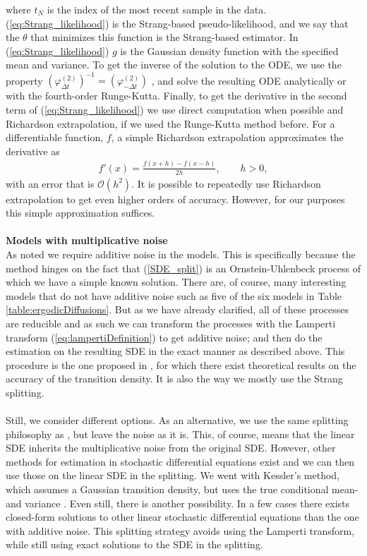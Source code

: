 where $t_N$ is the index of the most recent sample in the data. (\ref{eq:Strang_likelihood}) is the Strang-based pseudo-likelihood, and we say that the $\theta$ that minimizes this function is the Strang-based estimator. In (\ref{eq:Strang_likelihood}) $g$ is the Gaussian density function with the specified mean and variance. 
To get the inverse of the solution to the ODE, we use the property $\left(\varphi_{\Delta t}^{(2)}\right)^{-1} = \left(\varphi_{-\Delta t}^{(2)}\right)$ \cite[Remark below equation (9)]{SplittingSchemes}, and solve the resulting ODE analytically or with the fourth-order Runge-Kutta. Finally, to get the derivative in the second term of (\ref{eq:Strang_likelihood}) we use direct computation when possible and Richardson extrapolation, if we used the Runge-Kutta method before. For a differentiable function, $f$, a simple Richardson extrapolation approximates the derivative as
\begin{align}
    f'(x) = \frac{f(x + h) - f(x - h)}{2h}, \qquad h > 0,
\end{align}
with an error that is $\mathcal{O}(h^2)$. It is possible to repeatedly use Richardson extrapolation to get even higher orders of accuracy. However, for our purposes this simple approximation suffices.
\\\\
\textbf{Models with multiplicative noise}\\
As noted we require additive noise in the models. This is specifically because the method hinges on the fact that (\ref{SDE_split}) is an Ornstein-Uhlenbeck process of which we have a simple known solution. There are, of course, many interesting models that do not have additive noise such as five of the six models in Table \ref{table:ergodicDiffusions}. But as we have already clarified, all of these processes are reducible and as such we can transform the processes with the Lamperti transform (\ref{eq:lampertiDefinition}) to get additive noise; and then do the estimation on the resulting SDE in the exact manner as described above. This procedure is the one proposed in \cite{SplittingSchemes}, for which there exist theoretical results on the accuracy of the transition density. It is also the way we mostly use the Strang splitting.\\\\
Still, we consider different options. As an alternative, we use the same splitting philosophy as \cite{SplittingSchemes}, but leave the noise as it is. This, of course, means that the linear SDE inherits the multiplicative noise from the original SDE. However, other methods for estimation in stochastic differential equations exist and we can then use those on the linear SDE in the splitting. We went with Kessler's method, which assumes a Gaussian transition density, but uses the true conditional mean- and variance \cite[equation (1.7)]{Kessler1997}. Even still, there is another possibility. In a few cases there exists closed-form solutions to other linear stochastic differential equations than the one with additive noise. This splitting strategy avoids using the Lamperti transform, while still using exact solutions to the SDE in the splitting. \\\\

